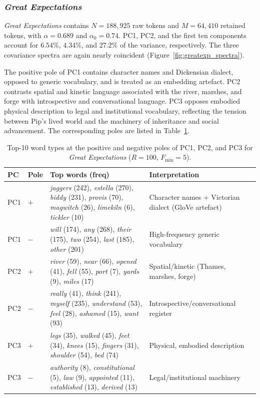 \documentclass[12pt,a4paper]{article}
\begin{document}
\subsubsection{\emph{Great Expectations}}
\label{sec:greatexp}

\emph{Great Expectations} contains $N=188{,}925$ raw tokens and
$M=64{,}410$ retained tokens, with $\alpha=0.689$ and
$\alpha_0=0.74$. PC1, PC2, and the first ten components account for
$6.54\%$, $4.34\%$, and $27.2\%$ of the variance, respectively. The
three covariance spectra are again nearly coincident
(Figure~\ref{fig:greatexp_spectra}).

The positive pole of PC1 contains character names and Dickensian
dialect, opposed to generic vocabulary, and is treated as an embedding
artefact. PC2 contrasts spatial and kinetic language associated with
the river, marshes, and forge with introspective and conversational
language. PC3 opposes embodied physical description to legal and
institutional vocabulary, reflecting the tension between Pip's lived
world and the machinery of inheritance and social advancement. The
corresponding poles are listed in Table~\ref{tab:greatexp_pc}.

\begin{table}[htbp]
\centering
\caption{Top-10 word types at the positive and negative poles
of PC1, PC2, and PC3 for \emph{Great Expectations}
($R=100$, $F_{\min}=5$).}
\label{tab:greatexp_pc}
\small
\setlength{\tabcolsep}{4pt}
\begin{tabular}{ll p{6cm} p{5.5cm}}
\toprule
PC & Pole & Top words (freq) & Interpretation \\
\midrule
PC1 & $+$ &
  \emph{jaggers} (242), \emph{estella} (270), \emph{biddy} (231),
  \emph{provis} (70), \emph{magwitch} (26),
  \emph{limekiln} (6), \emph{tickler} (10)
  & Character names + Victorian dialect (GloVe artefact) \\
PC1 & $-$ &
  \emph{will} (174), \emph{any} (268), \emph{their} (175),
  \emph{two} (254), \emph{last} (185), \emph{other} (201)
  & High-frequency generic vocabulary \\
\midrule
PC2 & $+$ &
  \emph{river} (59), \emph{near} (66), \emph{opened} (41),
  \emph{fell} (55), \emph{port} (7), \emph{yards} (9),
  \emph{miles} (17)
  & Spatial/kinetic (Thames, marshes, forge) \\
PC2 & $-$ &
  \emph{really} (41), \emph{think} (241), \emph{myself} (235),
  \emph{understand} (53), \emph{feel} (28),
  \emph{ashamed} (15), \emph{want} (93)
  & Introspective/conversational register \\
\midrule
PC3 & $+$ &
  \emph{legs} (35), \emph{walked} (45), \emph{feet} (34),
  \emph{knees} (15), \emph{fingers} (31),
  \emph{shoulder} (54), \emph{bed} (74)
  & Physical, embodied description \\
PC3 & $-$ &
  \emph{authority} (8), \emph{constitutional} (5),
  \emph{law} (9), \emph{appointed} (11),
  \emph{established} (13), \emph{derived} (13)
  & Legal/institutional machinery \\
\bottomrule
\end{tabular}
\end{table}
\end{document}
